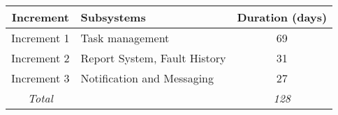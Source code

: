 
\begin{tabular}{c|l|c}
\textbf{Increment} & \textbf{Subsystems} & \textbf{Duration (days)} \\ \hline
Increment 1 & Task management & 69 \\
Increment 2 & Report System, Fault History & 31 \\
Increment 3 & Notification and Messaging & 27 \\ \hline
\textit{Total} &  & \textit{128} \\
\end{tabular}
